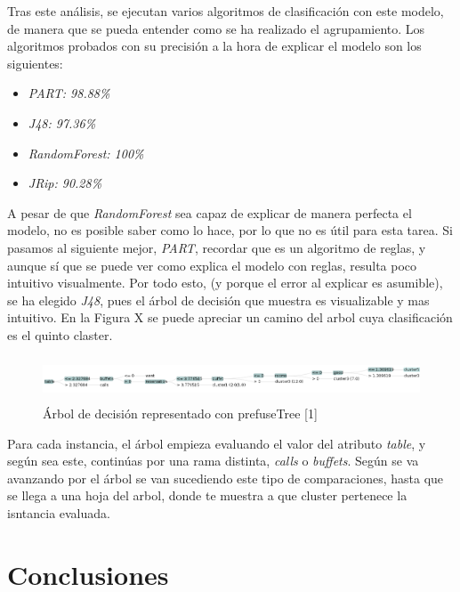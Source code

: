 \documentclass[12pt,a4paper, xcolor=table]{article}
\begin{document}
\vspace{2mm}

Tras este análisis, se ejecutan varios algoritmos de clasificación con este modelo, de manera que se pueda entender como se ha realizado el agrupamiento. Los algoritmos probados con su precisión a la hora de explicar el modelo son los siguientes:

\begin{itemize}
    \item \textit{PART: 98.88\%}
    \item \textit{J48: 97.36\%}
    \item \textit{RandomForest: 100\%}
    \item \textit{JRip: 90.28\%}
\end{itemize}

A pesar de que \textit{RandomForest} sea capaz de explicar de manera perfecta el modelo, no es posible saber como lo hace, por lo que no es útil para esta tarea. Si pasamos al siguiente mejor, \textit{PART}, recordar que es un algoritmo de reglas, y aunque sí que se puede ver como explica el modelo con reglas, resulta poco intuitivo visualmente. Por todo esto, (y porque el error al explicar es asumible), se ha elegido \textit{J48}, pues el árbol de decisión que muestra es visualizable y mas intuitivo. En la Figura X se puede apreciar un camino del arbol cuya clasificación es el quinto claster.

\begin{figure}[h]
  \centering
  \includegraphics[width=500px, height=50px]{img/arbol_decision.png}
  \caption{Árbol de decisión representado con prefuseTree [1]}
  \label{fig:graf_exp1}
\end{figure}

Para cada instancia, el árbol empieza evaluando el valor del atributo \textit{table}, y según sea este, continúas por una rama distinta, \textit{calls} o \textit{buffets}. Según se va avanzando por el árbol se van sucediendo este tipo de comparaciones, hasta que se llega a una hoja del arbol, donde te muestra a que cluster pertenece la isntancia evaluada. 

\section{Conclusiones}
\end{document}
